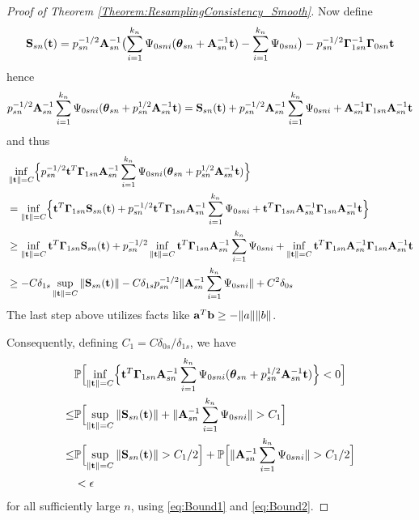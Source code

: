 \begin{proof}[Proof of Theorem \ref{Theorem:ResamplingConsistency_Smooth}]
Now define
% 
\begin{align} 
{\mathbf{S}}_{s n} ({\bf{t}}) = 
p_{s n}^{-1/2} {\mathbf{A}}_{ s n}^{-1} \bigl( \sum_{i = 1}^{ k_{n}} \Psi_{0 s n i} 
({\boldsymbol{\theta}}_{ s n} + {\mathbf{A}}_{ s n}^{-1} {\bf{t}}) 
- \sum_{i = 1}^{ k_{n}} \Psi_{0 s n i}  \bigr) 
- p_{s n}^{-1/2}  {\boldsymbol{\Gamma}}_{1 s n }^{-1} {\boldsymbol{\Gamma}}_{0 s n } {\bf{t}} 
\end{align}
%
hence
% 
\begin{align} 
p_{s n}^{-1/2} {\mathbf{A}}_{ s n}^{-1}  \sum_{i = 1}^{ k_{n}} \Psi_{0 s n i} 
({\boldsymbol{\theta}}_{ s n} +  p_{s n}^{1/2} {\mathbf{A}}_{ s n}^{-1} {\bf{t}}) 
= {\mathbf{S}}_{s n}( {\bf{t}} ) + 
p_{s n}^{-1/2} {\mathbf{A}}_{ s n}^{-1}   \sum_{i = 1}^{ k_{n}} \Psi_{0 s n i} 
+ {\mathbf{A}}_{ s n}^{-1} {\boldsymbol{\Gamma}}_{1 s n } {\mathbf{A}}_{ s n}^{-1} {\bf{t}}
\end{align}
%
and thus
%
\begin{align} 
& \inf_{ \| {\bf{t}} \| = C} 
\Bigl\{ p_{s n}^{-1/2} 
{\bf{t}}^{T} {\boldsymbol{\Gamma}}_{1 s n } {\mathbf{A}}_{ s n}^{-1}  \sum_{i = 1}^{ k_{n}} \Psi_{0 s n i} 
({\boldsymbol{\theta}}_{ s n} +  p_{s n}^{1/2} {\mathbf{A}}_{ s n}^{-1} {\bf{t}}) 
\Bigr\} \notag\\
& = 
 \inf_{ \| {\bf{t}} \| = C} 
\Bigl\{ 
{\bf{t}}^{T}  {\boldsymbol{\Gamma}}_{1 s n } {\mathbf{S}}_{s n}( {\bf{t}} ) + 
p_{s n}^{-1/2} {\bf{t}}^{T}  {\boldsymbol{\Gamma}}_{1 s n }  {\mathbf{A}}_{ s n}^{-1}  \sum_{i = 1}^{ k_{n}} \Psi_{0 s n i}  
+ {\bf{t}}^{T}  {\boldsymbol{\Gamma}}_{1 s n } {\mathbf{A}}_{ s n}^{-1} {\boldsymbol{\Gamma}}_{1 s n } {\mathbf{A}}_{ s n}^{-1} {\bf{t}}
\Bigr\} \notag\\
& \geq 
 \inf_{ \| {\bf{t}} \| = C} {\bf{t}}^{T}  {\boldsymbol{\Gamma}}_{1 s n } {\mathbf{S}}_{s n}( {\bf{t}} ) 
 + p_{s n}^{-1/2}  \inf_{ \| {\bf{t}} \| = C} {\bf{t}}^{T}  {\boldsymbol{\Gamma}}_{1 s n }  {\mathbf{A}}_{ s n}^{-1}  
 \sum_{i = 1}^{ k_{n}} \Psi_{0 s n i}  
 + \inf_{ \| {\bf{t}} \| = C} {\bf{t}}^{T}  {\boldsymbol{\Gamma}}_{1 s n } {\mathbf{A}}_{ s n}^{-1} {\boldsymbol{\Gamma}}_{1 s n } {\mathbf{A}}_{ s n}^{-1} {\bf{t}}
  \notag\\
 & \geq  - C  \delta_{1 s}  \sup_{ \| {\bf{t}} \| = C} \| {\mathbf{S}}_{s n}( {\bf{t}} ) \|
- C \delta_{1 s}  p_{s n}^{-1/2}   \| {\mathbf{A}}_{ s n}^{-1}  \sum_{i = 1}^{ k_{n}} \Psi_{0 s n i} \| 
+ C^{2}  \delta_{0 s}
\end{align}
The last step above utilizes facts like ${\bf{a}}^{T} {\bf{b}} \geq - \|a\| \|b\|$.  

Consequently, defining $C_{1} = C \delta_{ 0 s}/\delta_{1 s}$, we have 
\begin{align} 
& {\mathbb{P}} \Bigl[  
\inf_{ \| {\bf{t}} \| = C} 
\Bigl\{ 
{\bf{t}}^{T} {\boldsymbol{\Gamma}}_{1 s n }  {\mathbf{A}}_{ s n}^{-1}  \sum_{i = 1}^{ k_{n}} \Psi_{0 s n i} 
({\boldsymbol{\theta}}_{ s n} +  p_{s n}^{1/2} {\mathbf{A}}_{ s n}^{-1} {\bf{t}}) 
\Bigr\} < 0 
\Bigr] \notag\\
\leq 
& {\mathbb{P}} \Bigl[  
\sup_{ \| {\bf{t}} \| = C} \| {\mathbf{S}}_{s n}( {\bf{t}} ) \| + \| {\mathbf{A}}_{ s n}^{-1}  \sum_{i = 1}^{ k_{n}} \Psi_{0 s n i} \| 
> C_{1} 
\Bigr] \notag\\
\leq 
& {\mathbb{P}} \Bigl[  
\sup_{ \| {\bf{t}} \| = C} \| {\mathbf{S}}_{s n}( {\bf{t}} ) \|  > C_{1}/2 \Bigr] 
+ {\mathbb{P}} \Bigl[ 
\| {\mathbf{A}}_{ s n}^{-1}  \sum_{i = 1}^{ k_{n}} \Psi_{0 s n i} \| 
> C_{1}/2 
\Bigr] \notag\\
& < \epsilon 
\end{align}
for all sufficiently large $n$,  using \ref{eq:Bound1} and \ref{eq:Bound2}. 
 

\end{proof}
